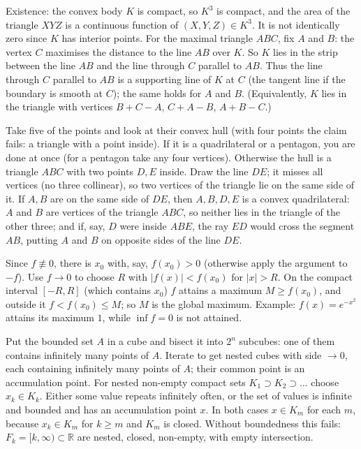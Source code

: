 \documentclass[11pt,a4paper]{article}
\begin{document}

 Existence: the convex body $K$ is compact, so $K^3$ is compact, and the area of the triangle $XYZ$ is a continuous function of $(X,Y,Z)\in K^3$. It is not identically zero since $K$ has interior points.
 For the maximal triangle $ABC$, fix $A$ and $B$: the vertex $C$ maximises the distance to the line $AB$ over $K$. So $K$ lies in the strip between the line $AB$ and the line through $C$ parallel to $AB$.
 Thus the line through $C$ parallel to $AB$ is a supporting line of $K$ at $C$ (the tangent line if the boundary is smooth at $C$); the same holds for $A$ and $B$. (Equivalently, $K$ lies in the triangle with vertices $B+C-A$, $C+A-B$, $A+B-C$.)

 Take five of the points and look at their convex hull (with four points the claim fails: a triangle with a point inside). If it is a quadrilateral or a pentagon, you are done at once (for a pentagon take any four vertices).
 Otherwise the hull is a triangle $ABC$ with two points $D,E$ inside. Draw the line $DE$; it misses all vertices (no three collinear), so two vertices of the triangle lie on the same side of it.
 If $A,B$ are on the same side of $DE$, then $A,B,D,E$ is a convex quadrilateral: $A$ and $B$ are vertices of the triangle $ABC$, so neither lies in the triangle of the other three; and if, say, $D$ were inside $ABE$, the ray $ED$ would cross the segment $AB$, putting $A$ and $B$ on opposite sides of the line $DE$.

 Since $f\not\equiv0$, there is $x_0$ with, say, $f(x_0)>0$ (otherwise apply the argument to $-f$). Use $f\to0$ to choose $R$ with $|f(x)|<f(x_0)$ for $|x|>R$.
 On the compact interval $[-R,R]$ (which contains $x_0$) $f$ attains a maximum $M\ge f(x_0)$, and outside it $f<f(x_0)\le M$; so $M$ is the global maximum.
 Example: $f(x)=e^{-x^2}$ attains its maximum $1$, while $\inf f=0$ is not attained.

 Put the bounded set $A$ in a cube and bisect it into $2^n$ subcubes: one of them contains infinitely many points of $A$. Iterate to get nested cubes with side $\to0$, each containing infinitely many points of $A$; their common point is an accumulation point.
 For nested non-empty compact sets $K_1\supset K_2\supset\dots$ choose $x_k\in K_k$. Either some value repeats infinitely often, or the set of values is infinite and bounded and has an accumulation point $x$. In both cases $x\in K_m$ for each $m$, because $x_k\in K_m$ for $k\ge m$ and $K_m$ is closed.
 Without boundedness this fails: $F_k=[k,\infty)\subset\mathbb R$ are nested, closed, non-empty, with empty intersection.
\end{document}

